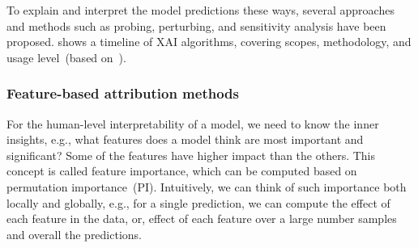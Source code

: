 \hspace*{3.5mm} To explain and interpret the model predictions these ways, several approaches and methods such as probing, perturbing, and sensitivity analysis have been proposed.  shows a timeline of XAI algorithms, covering scopes, methodology, and usage level~(based on~\cite{das2020opportunities}). %

\subsubsection{Feature-based attribution methods}
\label{subsubsec:FI_shap}
For the human-level interpretability of a model, we need to know the inner insights, e.g., what features does a model think are most important and significant? Some of the features have higher impact than the others. This concept is called feature importance, which can be computed based on permutation importance~(PI). Intuitively, we can think of such importance both locally and globally, e.g., for a single prediction, we can compute the effect of each feature in the data, or, effect of each feature over a large number samples and overall the predictions.

